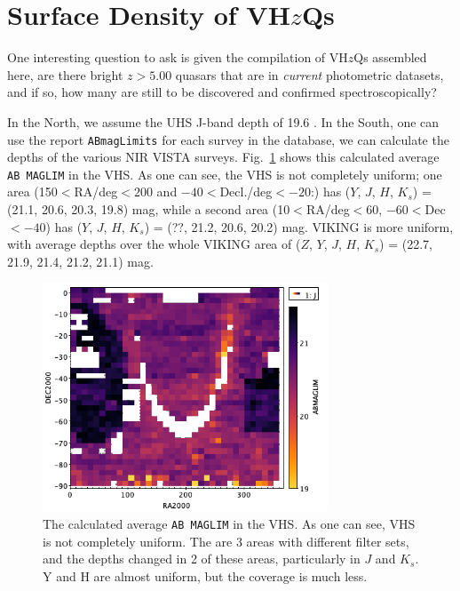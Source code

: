 \documentclass[usenatbib]{mnras}
\begin{document}
\section{Surface Density of VH$z$Qs}
One interesting question to ask is given the compilation of VH$z$Qs assembled here, 
are there bright $z>5.00$ quasars that are in {\it current} photometric datasets, and if 
so, how many are still to be discovered and confirmed spectroscopically?

In the North, we assume the UHS J-band depth of 19.6 \citep[Vega; ][]{Dye2018}. 
In the South, one can use the report {\tt ABmagLimits} for each survey in the database, we
can calculate the depths of the various NIR VISTA surveys.
Fig.~\ref{fig:VHS_J_abMagLim} shows this calculated average {\tt AB
MAGLIM} in the VHS.  As one can see, the VHS is not completely
uniform; one area (150$<$RA/deg$<200$ and $-40<$Decl./deg$<-20$:) has
($Y$, $J$, $H$, $K_{s}$) = (21.1, 20.6, 20.3, 19.8) mag, while a
second area (10$<$RA/deg$<$60, $-60<$Dec$<-40$) has ($Y$, $J$, $H$,
$K_{s}$) = (??, 21.2, 20.6, 20.2) mag.  VIKING is more uniform, with
average depths over the whole VIKING area of ($Z$, $Y$, $J$, $H$,
$K_{s}$) = (22.7, 21.9, 21.4, 21.2, 21.1) mag.


\begin{figure}
  \centering
  \includegraphics[width=8.5cm]{../data/WSA_VSA/VHS_J_abMagLim.png}
  \caption{The calculated average {\tt AB MAGLIM} in the VHS.
    As one can see, VHS is not completely uniform. The are 3 areas with different filter sets, 
    and the depths changed in 2 of these areas, particularly in $J$ and $K_{s}$. 
    Y and H are almost uniform, but the coverage is much less.}
  \label{fig:VHS_J_abMagLim}
\end{figure}
\end{document}
